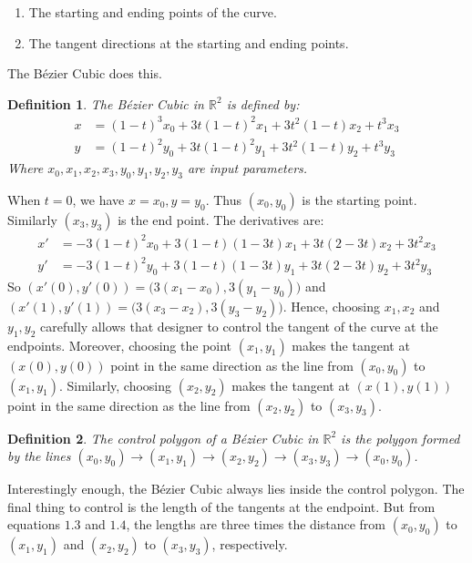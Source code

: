 \documentclass[oneside]{book}
\theoremstyle{mystyle}
\newtheorem{definition}{Definition}[section]
\begin{document}
\begin{enumerate}
    \item The starting and ending points of the curve.
    \item The tangent directions at the starting and ending points.
\end{enumerate}
The B\'{e}zier Cubic does this.
\begin{definition}
The B\'{e}zier Cubic in $\mathbb{R}^2$ is defined by:
\begin{align*}
    x &= (1-t)^3 x_0+3t(1-t)^2x_1+3t^2(1-t)x_2+t^3x_3 \\
    y &= (1-t)^2 y_0+3t(1-t)^2y_1+3t^2(1-t)y_2+t^3y_3
\end{align*}
Where $x_0,x_1,x_2,x_3,y_0,y_1,y_2,y_3$ are input parameters.
\end{definition}
When $t=0$, we have $x = x_0, y=y_0$. Thus $(x_0,y_0)$ is the starting point. Similarly $(x_3,y_3)$ is the end point. The derivatives are:
\begin{align*}
    x' &= -3(1-t)^2x_0 + 3(1-t)(1-3t)x_1+3t(2-3t)x_2+3t^2x_3 \\
    y' &= -3(1-t)^2y_0 + 3(1-t)(1-3t)y_1+3t(2-3t)y_2+3t^2y_3
\end{align*}
So $(x'(0),y'(0)) = \big(3(x_1-x_0),3(y_1-y_0)\big)$ and $(x'(1),y'(1)) = \big(3(x_3-x_2),3(y_3-y_2)\big)$. Hence, choosing $x_1,x_2$ and $y_1,y_2$ carefully allows that designer to control the tangent of the curve at the endpoints. Moreover, choosing the point $(x_1,y_1)$ makes the tangent at $(x(0),y(0))$ point in the same direction as the line from $(x_0,y_0)$ to $(x_1,y_1)$. Similarly, choosing $(x_2,y_2)$ makes the tangent at $(x(1),y(1))$ point in the same direction as the line from $(x_2,y_2)$ to $(x_3,y_3)$.
\begin{definition}
The control polygon of a B\'{e}zier Cubic in $\mathbb{R}^2$ is the polygon formed by the lines $(x_0,y_0)\rightarrow(x_1,y_1)\rightarrow(x_2,y_2)\rightarrow(x_3,y_3)\rightarrow (x_0,y_0)$.
\end{definition}
Interestingly enough, the B\'{e}zier Cubic always lies inside the control polygon. The final thing to control is the length of the tangents at the endpoint. But from equations $1.3$ and $1.4$, the lengths are three times the distance from $(x_0,y_0)$ to $(x_1,y_1)$ and $(x_2,y_2)$ to $(x_3,y_3)$, respectively. 
\end{document}

